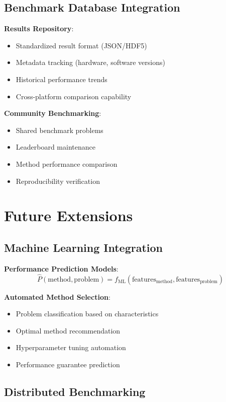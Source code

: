 \documentclass[11pt,a4paper]{article}
\begin{document}
\subsection{Benchmark Database Integration}

\textbf{Results Repository}:
\begin{itemize}
\item Standardized result format (JSON/HDF5)
\item Metadata tracking (hardware, software versions)
\item Historical performance trends
\item Cross-platform comparison capability
\end{itemize}

\textbf{Community Benchmarking}:
\begin{itemize}
\item Shared benchmark problems
\item Leaderboard maintenance
\item Method performance comparison
\item Reproducibility verification
\end{itemize}

\section{Future Extensions}

\subsection{Machine Learning Integration}

\textbf{Performance Prediction Models}:
\begin{equation}
\hat{P}(\text{method}, \text{problem}) = f_{\text{ML}}(\text{features}_{\text{method}}, \text{features}_{\text{problem}})
\end{equation}

\textbf{Automated Method Selection}:
\begin{itemize}
\item Problem classification based on characteristics
\item Optimal method recommendation
\item Hyperparameter tuning automation
\item Performance guarantee prediction
\end{itemize}

\subsection{Distributed Benchmarking}
\end{document}
